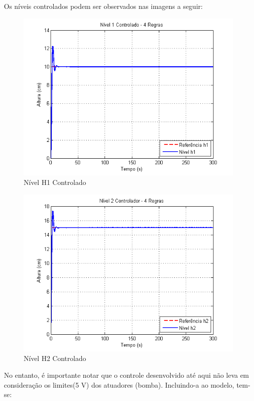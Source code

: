 Os níveis controlados podem ser observados nas imagens a seguir:
\begin{figure}[H]
	\centering
	\includegraphics[height=0.35\paperheight ,keepaspectratio]{img/ctrl_h1ts2_free.png}
	\caption{\small Nível H1 Controlado }
	\label{figH1TSCtrl2_free}
\end{figure}

\begin{figure}[H]
	\centering
	\includegraphics[height=0.35\paperheight ,keepaspectratio]{img/ctrl_h2ts2_free.png}
	\caption{Nível H2 Controlado }
	\label{figH2CtrlTS2_free}
\end{figure}

No entanto, é importante notar que o controle desenvolvido até aqui não leva em consideração os limites(5 V) dos atuadores (bomba). Incluindo-a ao modelo, tem-se:

